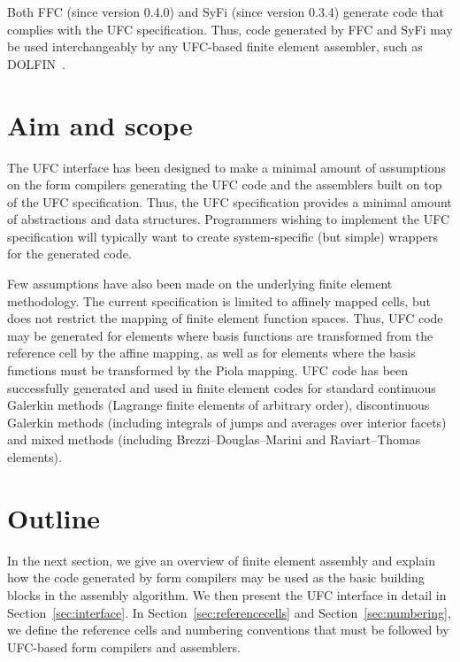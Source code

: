 Both FFC (since version 0.4.0) and SyFi (since version 0.3.4)
generate code that complies with the UFC specification. Thus, code
generated by FFC and SyFi may be used interchangeably by any UFC-based
finite element assembler, such as DOLFIN~\cite{www:dolfin}.

\section{Aim and scope}

The UFC interface has been designed to make a minimal amount of
assumptions on the form compilers generating the UFC code and the
assemblers built on top of the UFC specification. Thus, the UFC
specification provides a minimal amount of abstractions and data
structures. Programmers wishing to implement the UFC specification
will typically want to create system-specific (but simple) wrappers
for the generated code.

Few assumptions have also been made on the underlying finite element
methodology. The current specification is limited to affinely mapped
cells, but does not restrict the mapping of finite element function
spaces. Thus, UFC code may be generated for elements where basis
functions are transformed from the reference cell by the affine
mapping, as well as for elements where the basis functions must be
transformed by the Piola mapping. UFC code has been successfully
generated and used in finite element codes for standard continuous
Galerkin methods (Lagrange finite elements of arbitrary order),
discontinuous Galerkin methods (including integrals of jumps and
averages over interior facets) and mixed methods (including
Brezzi--Douglas--Marini and Raviart--Thomas elements).

\section{Outline}

In the next section, we give an overview of finite element assembly
and explain how the code generated by form compilers may be used as
the basic building blocks in the assembly algorithm. We then present
the UFC interface in detail in Section~\ref{sec:interface}. In
Section~\ref{sec:referencecells} and Section~\ref{sec:numbering}, we
define the reference cells and numbering conventions that must be
followed by UFC-based form compilers and assemblers.

